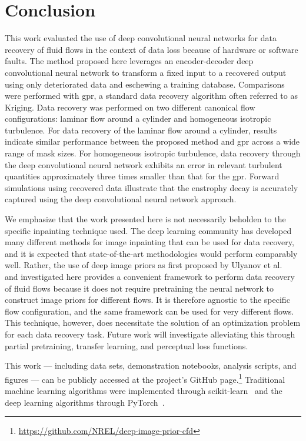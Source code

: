 \documentclass[review]{elsarticle}
\begin{document}
\section{Conclusion}\label{sec:ccl}

This work evaluated the use of deep convolutional neural networks for
data recovery of fluid flows in the context of data loss because of
hardware or software faults. The method proposed here leverages an
encoder-decoder deep convolutional neural network to transform a fixed
input to a recovered output using only deteriorated data and
eschewing a training database. Comparisons were performed with
\acrlong{gpr}, a standard data recovery algorithm often referred to as
Kriging. Data recovery was performed on two different canonical flow
configurations: laminar flow around a cylinder and homogeneous
isotropic turbulence. For data recovery of the laminar flow around a
cylinder, results indicate similar performance between the proposed
method and \gls{gpr} across a wide range of mask sizes. For homogeneous
isotropic turbulence, data recovery through the deep convolutional
neural network exhibits an error in relevant turbulent quantities
approximately three times smaller than that for the \gls{gpr}. Forward
simulations using recovered data illustrate that the enstrophy decay
is accurately captured using the deep convolutional neural network
approach.

We emphasize that the work presented here is not necessarily beholden
to the specific inpainting technique used. The deep learning community
has developed many different methods for image inpainting that can be
used for data recovery, and it is expected that state-of-the-art
methodologies would perform comparably well. Rather, the use of deep
image priors as first proposed by Ulyanov et al.~\cite{Ulyanov2017}
and investigated here provides a convenient framework to perform data
recovery of fluid flows because it does not require pretraining the neural
network to construct image priors for different flows. It is therefore
agnostic to the specific flow configuration, and the same framework can
be used for very different flows. This technique, however, does
necessitate the solution of an optimization problem for each data
recovery task. Future work will investigate alleviating this through
partial pretraining, transfer learning, and perceptual loss
functions.

This work --- including data sets, demonstration notebooks, analysis
scripts, and figures --- can be publicly accessed at the project's GitHub
page.\footnote{\url{https://github.com/NREL/deep-image-prior-cfd}} Traditional
machine learning algorithms were implemented through
scikit-learn~\cite{Pedregosa2011} and the deep learning algorithms
through PyTorch~\cite{Paszke2017}.
\end{document}
